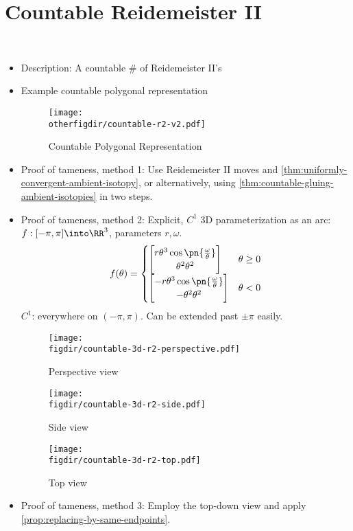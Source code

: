 \section{Countable Reidemeister II}
\begin{example}~
  \begin{itemize}
    \item Description: A countable \# of Reidemeister II's
    \item Example countable polygonal representation
      \begin{figure}[H]
        \centering
        \texttt{[image: \\otherfigdir/countable-r2-v2.pdf]}
        \caption{Countable Polygonal Representation}
      \end{figure}
    \item Proof of tameness, method 1: Use Reidemeister II moves and
      \cref{thm:uniformly-convergent-ambient-isotopy}, or
      alternatively, using
      \cref{thm:countable-gluing-ambient-isotopies} in two steps.
    \item Proof of tameness, method 2: Explicit, $C^1$ 3D parameterization
      as an arc: $f : [-\pi,\pi] \into \RR^3$, parameters $r, \omega$.
      \[
      f(\theta) =
      \begin{cases}
        \begin{bmatrix}
          r \theta^3 \cos\pn{\frac{\omega}{\theta}} \\
          \theta^2
          \theta^2
        \end{bmatrix} & \theta \geq 0 \\
        \begin{bmatrix}
          -r \theta^3 \cos\pn{\frac{\omega}{\theta}} \\
          -\theta^2
          \theta^2
        \end{bmatrix} & \theta < 0
      \end{cases}
      \]
      $C^1$: everywhere on $(-\pi, \pi)$. Can be extended past $\pm
      \pi$ easily.
      \begin{figure}[H]
        \centering
        \texttt{[image: \\figdir/countable-3d-r2-perspective.pdf]}
        \caption{Perspective view}
        \label{fig:countable-r2-perspective}
      \end{figure}
      \begin{figure}[H]
        \centering
        \texttt{[image: \\figdir/countable-3d-r2-side.pdf]}
        \caption{Side view}
        \label{fig:countable-r2-side}
      \end{figure}
      \begin{figure}[H]
        \centering
        \texttt{[image: \\figdir/countable-3d-r2-top.pdf]}
        \caption{Top view}
      \end{figure}
    \item Proof of tameness, method 3: Employ the top-down view and
      apply \cref{prop:replacing-by-same-endpoints}.
  \end{itemize}
\end{example}







